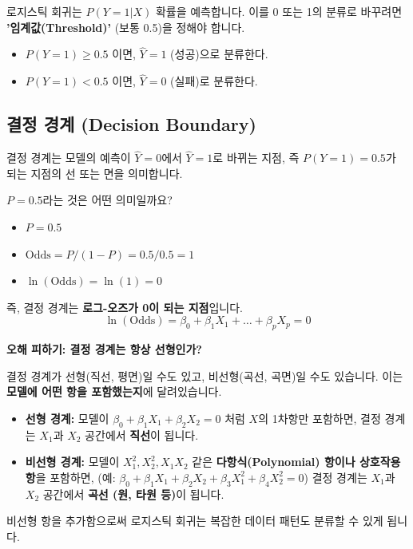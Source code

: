 \documentclass[11pt,a4paper]{book}
\theoremstyle{definition}
\begin{document}
로지스틱 회귀는 $P(Y=1|X)$ 확률을 예측합니다.
이를 0 또는 1의 분류로 바꾸려면 \textbf{'임계값(Threshold)'} (보통 0.5)을 정해야 합니다.

\begin{itemize}
  \item $P(Y=1) \ge 0.5$ 이면, $\hat{Y} = 1$ (성공)으로 분류한다.
  \item $P(Y=1) < 0.5$ 이면, $\hat{Y} = 0$ (실패)로 분류한다.
\end{itemize}

\subsection{결정 경계 (Decision Boundary)}

결정 경계는 모델의 예측이 $\hat{Y}=0$에서 $\hat{Y}=1$로 바뀌는 지점, 즉 $P(Y=1) = 0.5$가 되는 지점의 선 또는 면을 의미합니다.

$P=0.5$라는 것은 어떤 의미일까요?
\begin{itemize}
  \item $P = 0.5$
  \item $\text{Odds} = P / (1-P) = 0.5 / 0.5 = 1$
  \item $\ln(\text{Odds}) = \ln(1) = 0$
\end{itemize}

즉, 결정 경계는 \textbf{로그-오즈가 0이 되는 지점}입니다.
$$ \ln(\text{Odds}) = \beta_0 + \beta_1 X_1 + \dots + \beta_p X_p = 0 $$

\begin{warningbox}
  \textbf{오해 피하기: 결정 경계는 항상 선형인가?}

  결정 경계가 선형(직선, 평면)일 수도 있고, 비선형(곡선, 곡면)일 수도 있습니다.
  이는 \textbf{모델에 어떤 항을 포함했는지}에 달려있습니다.

  \begin{itemize}
    \item \textbf{선형 경계:}
        모델이 $\beta_0 + \beta_1 X_1 + \beta_2 X_2 = 0$ 처럼 $X$의 1차항만 포함하면,
        결정 경계는 $X_1$과 $X_2$ 공간에서 \textbf{직선}이 됩니다.

    \item \textbf{비선형 경계:}
        모델이 $X_1^2, X_2^2, X_1 X_2$ 같은 \textbf{다항식(Polynomial) 항이나 상호작용 항}을 포함하면,
        (예: $\beta_0 + \beta_1 X_1 + \beta_2 X_2 + \beta_3 X_1^2 + \beta_4 X_2^2 = 0$)
        결정 경계는 $X_1$과 $X_2$ 공간에서 \textbf{곡선 (원, 타원 등)}이 됩니다.
  \end{itemize}
  비선형 항을 추가함으로써 로지스틱 회귀는 복잡한 데이터 패턴도 분류할 수 있게 됩니다.
\end{warningbox}
\end{document}
